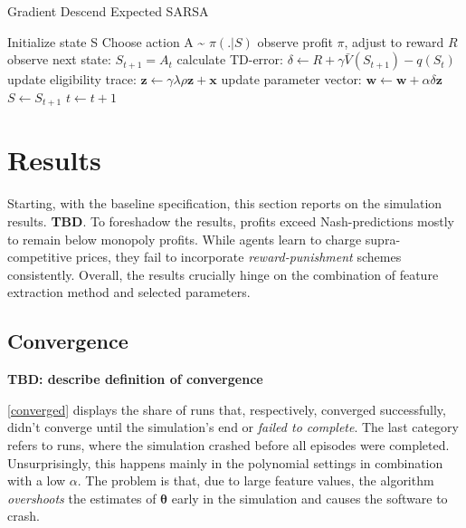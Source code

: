 

\pagebreak
\begin{algorithm}
	\caption{Gradient Descend Expected SARSA}
	\begin{algorithmic}[]
		\small
		\STATE Initialize state S
		\STATE Choose action A \~{} $\pi(.|S)$
		\STATE observe profit $\pi$, adjust to reward $R$
		\STATE observe next state: $S_{t+1} = A_t$
		\STATE calculate TD-error: $\delta \leftarrow R +  \gamma \bar{V}(S_{t+1}) - q(S_t)$
		\STATE update eligibility trace: $\boldsymbol{z} \leftarrow \gamma \lambda \rho \boldsymbol{z} + \boldsymbol{x} $
		\STATE update parameter vector: $\boldsymbol{w} \leftarrow \boldsymbol{w} + \alpha  \delta  \boldsymbol{z}$
		\STATE $S \leftarrow S_{t+1}$
		\STATE $t \leftarrow t+1$
		\ENDWHILE
	\end{algorithmic}
\end{algorithm}
















\section{Results}

Starting, with the baseline specification, this section reports on the simulation results. \textbf{TBD}. To foreshadow the results, profits exceed Nash-predictions mostly to remain below monopoly profits. While agents learn to charge supra-competitive prices, they fail to incorporate \emph{reward-punishment} schemes consistently.  Overall, the results crucially hinge on the combination of feature extraction method and selected parameters.

\subsection{Convergence}

\textbf{TBD: describe definition of convergence}

\autoref{converged} displays the share of runs that, respectively, converged successfully, didn't converge until the simulation's end or \emph{failed to complete}. The last category refers to runs, where the simulation crashed before all episodes were completed. Unsurprisingly, this happens mainly in the polynomial settings in combination with a low $\alpha$. The problem is that, due to large feature values, the algorithm \emph{overshoots} the estimates of $\boldsymbol{\theta}$ early in the simulation and causes the software to crash.

